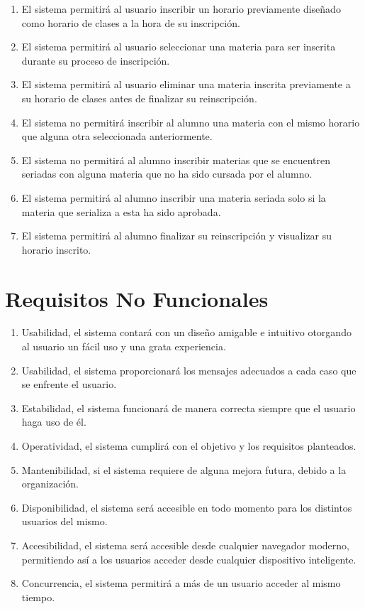 \begin{enumerate}[{RF} 1.]
\item El sistema permitirá al usuario inscribir un horario previamente diseñado como horario de clases a la hora de su inscripción.
\item El sistema permitirá al usuario seleccionar una materia para ser inscrita durante su proceso de inscripción.
\item El sistema permitirá al usuario eliminar una materia inscrita previamente a su horario de clases antes de finalizar su reinscripción.
\item El sistema no permitirá inscribir al alumno una materia con el mismo horario que alguna otra seleccionada anteriormente.
\item El sistema no permitirá al alumno inscribir materias que se encuentren seriadas con alguna materia que no ha sido cursada por el alumno.
\item El sistema permitirá al alumno inscribir una materia seriada solo si la materia que serializa a esta ha sido aprobada.
\item El sistema permitirá al alumno finalizar su reinscripción y visualizar su horario inscrito.
\end{enumerate}
\newpage
\section{Requisitos No Funcionales}
\begin{enumerate}[{RNF} 1.]
\item Usabilidad, el sistema contará con un diseño amigable e intuitivo otorgando al usuario un fácil uso y una grata experiencia.
\item Usabilidad, el sistema proporcionará los mensajes adecuados a cada caso que se enfrente el usuario.
\item Estabilidad, el sistema funcionará de manera correcta siempre que el usuario haga uso de él.
\item Operatividad, el sistema cumplirá con el objetivo y los requisitos planteados.
\item Mantenibilidad, si el sistema requiere de alguna mejora futura, debido a la organización.
\item Disponibilidad, el sistema será accesible en todo momento para los distintos usuarios del mismo.
\item Accesibilidad, el sistema será accesible desde cualquier navegador moderno, permitiendo así a los usuarios acceder desde cualquier dispositivo inteligente.
\item Concurrencia, el sistema permitirá a más de un usuario acceder al mismo tiempo.
\end{enumerate}
\newpage

